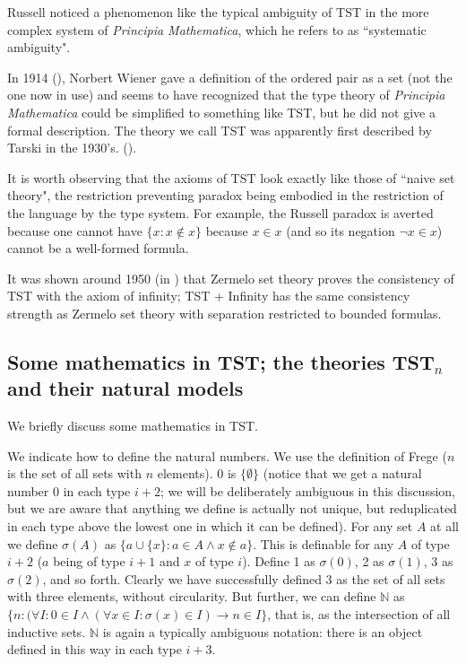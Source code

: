 \documentclass[112pt]{article}
\begin{document}
Russell noticed a phenomenon like the typical ambiguity of TST in the more complex system of {\em Principia Mathematica\/}, which he refers to as ``systematic ambiguity".

In 1914 (\cite{wiener}), Norbert Wiener gave a definition of the ordered pair as a set (not the one now in use) and seems to have recognized that the type theory of {\em Principia Mathematica\/} could be simplified to something like TST, but he did not give a formal description.  The theory we call TST was apparently first described by Tarski in the 1930's.  (\cite{tarskiontst}).

It is worth observing that the axioms of TST look exactly like those of ``naive set theory", the restriction preventing paradox being embodied in the restriction of the language by the type system.
For example, the Russell paradox is averted because one cannot have $\{x:x \not\in x\}$ because $x \in x$ (and so its negation $\neg x \in x$) cannot be a well-formed formula.

It was shown around 1950 (in \cite{kemeny}) that Zermelo set theory proves the consistency of TST with the axiom of infinity;  TST + Infinity has the same consistency strength as
Zermelo set theory with separation restricted to bounded formulas.




\newpage

\subsection{Some mathematics in TST;  the theories TST$_n$ and their natural models}

We briefly discuss some mathematics in TST.

We indicate how to define the natural numbers.  We use the definition of Frege ($n$ is the set of all sets with $n$ elements).  0 is $\{\emptyset\}$ (notice that we get a natural number 0 in each type $i+2$;  we will be deliberately ambiguous in this discussion, but we are aware that anything we define is actually not unique, but reduplicated in each type above the lowest one in which it can be defined).  For any set $A$ at all we define $\sigma(A)$ as $\{a \cup \{x\}:a \in A \wedge x \not\in a\}$.  This is definable for any $A$ of type $i+2$ ($a$ being of type $i+1$ and $x$ of type $i$).  Define 1 as $\sigma(0)$, 2 as $\sigma(1)$,  3 as $\sigma(2)$, and so forth.  Clearly we have successfully defined 3 as the set of all sets with three elements, without circularity.
But further, we can define $\mathbb N$ as $\{n:(\forall I:0 \in I \wedge (\forall x \in I:\sigma(x) \in I) \rightarrow n \in I\}$, that is, as the intersection of all inductive sets.
$\mathbb N$ is again a typically ambiguous notation:  there is an object defined in this way in each type $i+3$.
\end{document}
